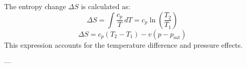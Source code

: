 The entropy change \( \Delta S \) is calculated as:  
\[
\Delta S = \int \frac{c_p}{T} \, dT = c_p \ln \left( \frac{T_2}{T_1} \right)
\]  
\[
\Delta S = c_p \left( T_2 - T_1 \right) - v \left( p - p_{\text{sat}} \right)
\]  
This expression accounts for the temperature difference and pressure effects.  

---